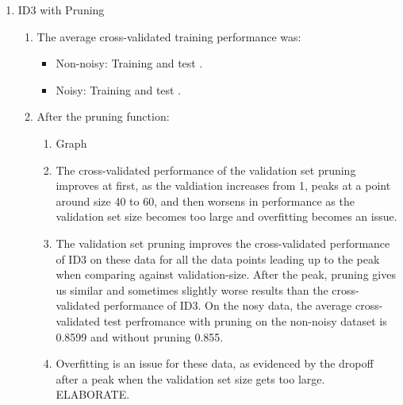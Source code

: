 \documentclass[11pt]{article}
\begin{document}
\begin{enumerate}
\item ID3 with Pruning
\begin{enumerate}
\item The average cross-validated training performance was:
	\begin{itemize}
	\item Non-noisy: Training  and test .
	\item Noisy: Training  and test .
	\end{itemize}
\item After the pruning function:
	\begin{enumerate}
	\item Graph
	\item The cross-validated performance of the validation set pruning improves at first, as the valdiation increases from 1, peaks at a point around size 40 to 60, and then worsens in performance as the validation set size becomes too large and overfitting becomes an issue.
	\item The validation set pruning improves the cross-validated performance of ID3 on these data for all the data points leading up to the peak when comparing against validation-size. After the peak, pruning gives us similar and sometimes slightly worse results than the cross-validated performance of ID3. On the nosy data, the average cross-validated test perfromance with pruning on the non-noisy dataset is 0.8599 and without pruning 0.855.
	\item Overfitting is an issue for these data, as evidenced by the dropoff after a peak when the validation set size gets too large. ELABORATE.
	\end{enumerate}
\end{enumerate}


\end{enumerate}
\end{document}

